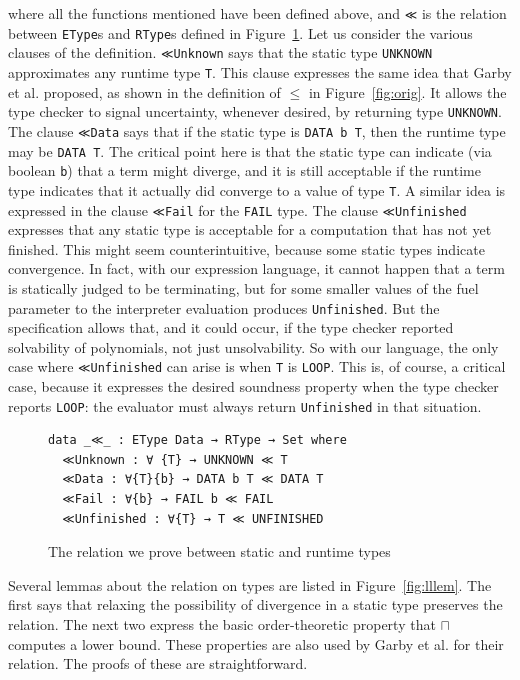 \documentclass[acmsmall,screen,review]{acmart}
\begin{document}
\noindent where all the functions mentioned have been defined above,
and \verb|≪| is the relation between \verb|EType|s and \verb|RType|s
defined in Figure~\ref{fig:ll}.  Let us consider the various clauses
of the definition.  \verb|≪Unknown| says that the static type
\verb|UNKNOWN| approximates any runtime type \verb|T|.  This clause
expresses the same idea that Garby et al. proposed, as shown in the
definition of $\le$ in Figure~\ref{fig:orig}.  It allows the type
checker to signal uncertainty, whenever desired, by returning type
\verb|UNKNOWN|.  The clause \verb|≪Data| says that if the static type
is \verb|DATA b T|, then the runtime type may be \verb|DATA T|.  The
critical point here is that the static type can indicate (via boolean
\verb|b|) that a term might diverge, and it is still acceptable if the
runtime type indicates that it actually did converge to a value of
type \verb|T|.  A similar idea is expressed in the clause \verb|≪Fail|
for the \verb|FAIL| type.  The clause \verb|≪Unfinished| expresses
that any static type is acceptable for a computation that has not yet
finished.  This might seem counterintuitive, because some static types
indicate convergence.  In fact, with our expression language, it
cannot happen that a term is statically judged to be terminating, but
for some smaller values of the fuel parameter to the interpreter
evaluation produces \verb|Unfinished|.  But the specification allows
that, and it could occur, if the type checker reported solvability of
polynomials, not just unsolvability.  So with our language, the only
case where \verb|≪Unfinished| can arise is when \verb|T| is
\verb|LOOP|.  This is, of course, a critical case, because it
expresses the desired soundness property when the type checker reports
\verb|LOOP|: the evaluator must always return \verb|Unfinished| in
that situation.

\begin{figure}
\begin{verbatim}  
data _≪_ : EType Data → RType → Set where
  ≪Unknown : ∀ {T} → UNKNOWN ≪ T
  ≪Data : ∀{T}{b} → DATA b T ≪ DATA T
  ≪Fail : ∀{b} → FAIL b ≪ FAIL
  ≪Unfinished : ∀{T} → T ≪ UNFINISHED
\end{verbatim}  
\caption{The relation we prove between static and runtime types}
\label{fig:ll}
\end{figure}  

Several lemmas about the relation on types are listed in
Figure~\ref{fig:lllem}.  The first says that relaxing the possibility
of divergence in a static type preserves the relation.  The next two
express the basic order-theoretic property that $\sqcap$ computes a
lower bound.  These properties are also used by Garby et al. for their
relation.  The proofs of these are straightforward.
\end{document}
